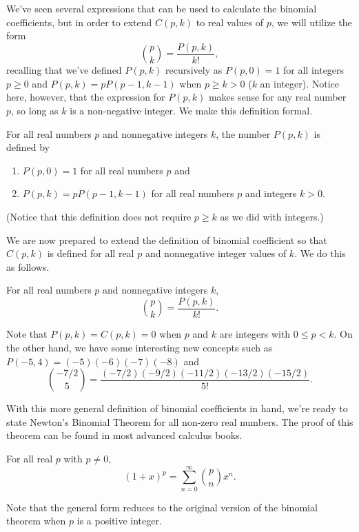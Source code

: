 We've seen several expressions that can be used to calculate the
binomial coefficients, but in order to extend $C(p,k)$ to real values
of $p$, we will utilize the form
\[
\binom{p}{k}=\frac{P(p,k)}{k!},
\]
recalling that we've defined $P(p,k)$ recursively as $P(p,0)=1$ for
all integers $p\geq 0$ and $P(p,k)=p P(p-1,k-1)$ when $p\geq k > 0$
($k$ an integer). Notice here, however, that the expression for
$P(p,k)$ makes sense for any real number $p$, so long as $k$ is
a non-negative integer.  We make this definition formal.

\begin{definition}
  For all real numbers $p$ and nonnegative integers $k$, the number
  $P(p,k)$ is defined by
  \begin{enumerate}
  \item $P(p,0)=1$ for all real numbers $p$ and
  \item $P(p,k) = p P(p-1,k-1)$ for all real numbers $p$ and integers $k>0$.
  \end{enumerate}
\end{definition}

(Notice that this definition does not require $p\geq k$ as we did with
integers.)

We are now prepared to extend the definition of binomial coefficient
so that $C(p,k)$ is defined for all real $p$ and nonnegative integer
values of $k$. We do this as follows.

\begin{definition}
  For all real numbers $p$ and nonnegative integers $k$,
  \[
  \binom{p}{k}=\frac{P(p,k)}{k!}.
  \]
\end{definition}

Note that $P(p,k)=C(p,k)= 0$ when $p$ and $k$ are integers with
$0\le p<k$.  On the other hand, we have some interesting new concepts
such as $P(-5,4)=(-5)(-6)(-7)(-8)$ and
\[
\binom{-7/2}{5}=\frac{(-7/2)(-9/2)(-11/2)(-13/2)(-15/2)}{5!}.
\]

With this more general definition of binomial coefficients in hand,
we're ready to state Newton's Binomial Theorem for all non-zero real
numbers. The proof of this theorem can be found in most advanced
calculus books.
\begin{theorem}\label{thm:newton-binomial}
For all real $p$ with $p\neq0$,
\[
(1+x)^p=\sum_{n=0}^\infty\binom{p}{n}x^n.
\]
\end{theorem}
Note that the general form reduces to the original version
of the binomial theorem when $p$ is a positive integer.

